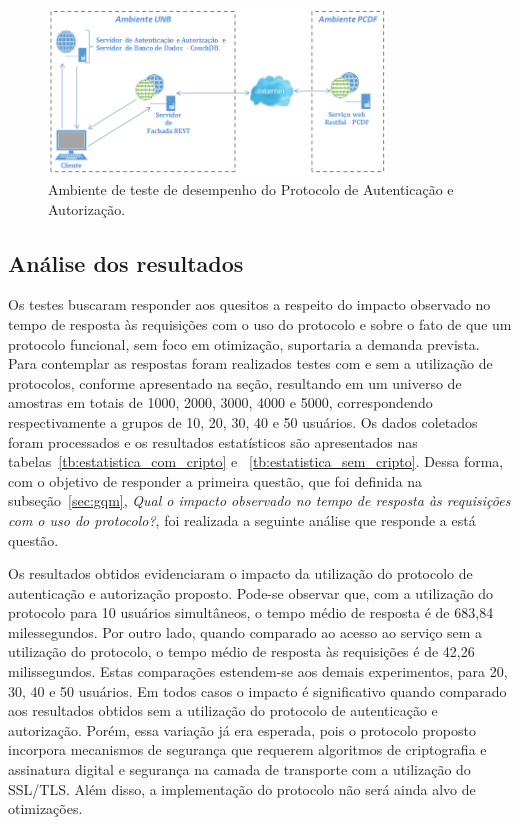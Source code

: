 \begin{figure}[!htb]
\centering
\includegraphics[width=0.8\textwidth]{ambiente_teste_desempenho.png}
\caption{Ambiente de teste de desempenho do Protocolo de Autenticação e Autorização.}
\label{fig:ambiente_teste}
\end{figure}

\subsection{Análise dos resultados}

Os testes buscaram responder aos quesitos a respeito do impacto observado no tempo de resposta às requisições com o uso do protocolo e sobre o fato de que um protocolo funcional, sem foco em otimização, suportaria a demanda prevista. Para contemplar as respostas foram realizados testes com e sem a utilização de protocolos, conforme apresentado na seção, resultando em um universo de amostras em totais de 1000, 2000, 3000, 4000 e 5000, correspondendo respectivamente a grupos de 10, 20, 30, 40 e 50 usuários. Os dados coletados foram processados e os resultados estatísticos são apresentados nas  tabelas~\ref{tb:estatistica_com_cripto} e ~\ref{tb:estatistica_sem_cripto}. Dessa forma, com o objetivo de responder a primeira questão, que foi definida na subseção~\ref{sec:gqm}, \emph{Qual o impacto observado no tempo de resposta às requisições com o uso do protocolo?}, foi realizada a seguinte análise que responde a está questão.

Os resultados obtidos evidenciaram o impacto da utilização do protocolo de autenticação e autorização proposto. Pode-se observar que, com a utilização do protocolo para 10 usuários simultâneos, o tempo médio de resposta é de 683,84 milessegundos. Por outro lado, quando comparado ao acesso ao serviço sem a utilização do protocolo, o tempo médio de resposta às requisições é de 42,26 milissegundos. Estas comparações estendem-se aos demais experimentos, para 20, 30, 40 e 50 usuários. Em todos casos o impacto é significativo quando comparado aos resultados obtidos sem a utilização do protocolo de autenticação e autorização. Porém, essa variação já era esperada, pois o protocolo proposto incorpora mecanismos de segurança que requerem algoritmos de criptografia e assinatura digital e segurança na camada de transporte com a utilização do SSL/TLS. Além disso, a implementação do protocolo não será ainda alvo de otimizações.

